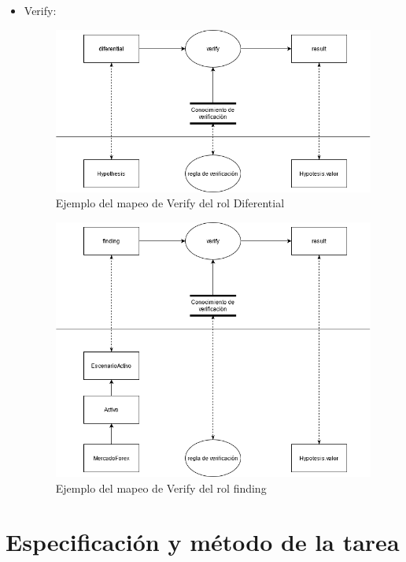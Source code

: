 \begin{itemize}
\begin{figure}[H]
  \end{figure}
  \item Verify:  
  \begin{figure}[H]
    \centering
    \includegraphics[scale=0.50]{imagenes/verify11.png}
    \caption{\label{fig:Verify}Ejemplo del mapeo de Verify del rol Diferential}
  \end{figure}
  \begin{figure}[H]
    \centering
    \includegraphics[scale=0.50]{imagenes/verify12.png}
    \caption{\label{fig:verify2}Ejemplo del mapeo de Verify del rol finding}
  \end{figure}
\end{itemize}

\section{Especificación y método de la tarea}